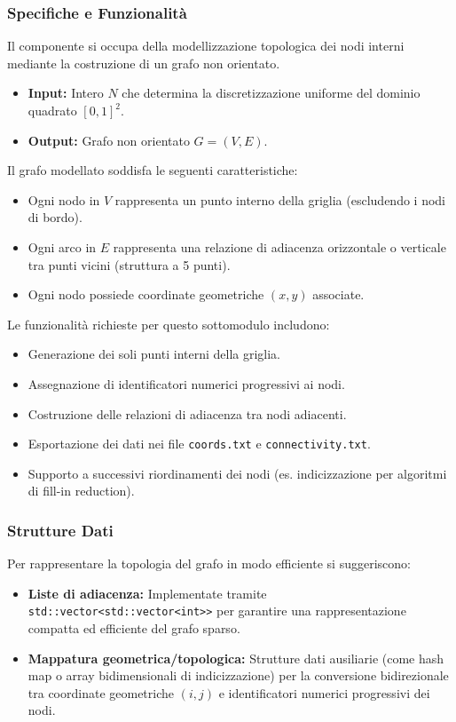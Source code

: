 \documentclass[twocolumn]{article}
\begin{document}
\subsubsection{Specifiche e Funzionalit\`a}
Il componente si occupa della modellizzazione topologica dei nodi interni mediante la costruzione di un grafo non orientato.
\begin{itemize}
    \item \textbf{Input:} Intero $N$ che determina la discretizzazione uniforme del dominio quadrato $[0, 1]^2$.
    \item \textbf{Output:} Grafo non orientato $G = (V, E)$.
\end{itemize}

Il grafo modellato soddisfa le seguenti caratteristiche:
\begin{itemize}
    \item Ogni nodo in $V$ rappresenta un punto interno della griglia (escludendo i nodi di bordo).
    \item Ogni arco in $E$ rappresenta una relazione di adiacenza orizzontale o verticale tra punti vicini (struttura a 5 punti).
    \item Ogni nodo possiede coordinate geometriche $(x, y)$ associate.
\end{itemize}

Le funzionalit\`a richieste per questo sottomodulo includono:
\begin{itemize}
    \item Generazione dei soli punti interni della griglia.
    \item Assegnazione di identificatori numerici progressivi ai nodi.
    \item Costruzione delle relazioni di adiacenza tra nodi adiacenti.
    \item Esportazione dei dati nei file \texttt{coords.txt} e \texttt{connectivity.txt}.
    \item Supporto a successivi riordinamenti dei nodi (es. indicizzazione per algoritmi di fill-in reduction).
\end{itemize}

\subsubsection{Strutture Dati}
Per rappresentare la topologia del grafo in modo efficiente si suggeriscono:
\begin{itemize}
    \item \textbf{Liste di adiacenza:} Implementate tramite \texttt{std::vector<std::vector<int>>} per garantire una rappresentazione compatta ed efficiente del grafo sparso.
    \item \textbf{Mappatura geometrica/topologica:} Strutture dati ausiliarie (come hash map o array bidimensionali di indicizzazione) per la conversione bidirezionale tra coordinate geometriche $(i, j)$ e identificatori numerici progressivi dei nodi.
\end{itemize}
\end{document}
